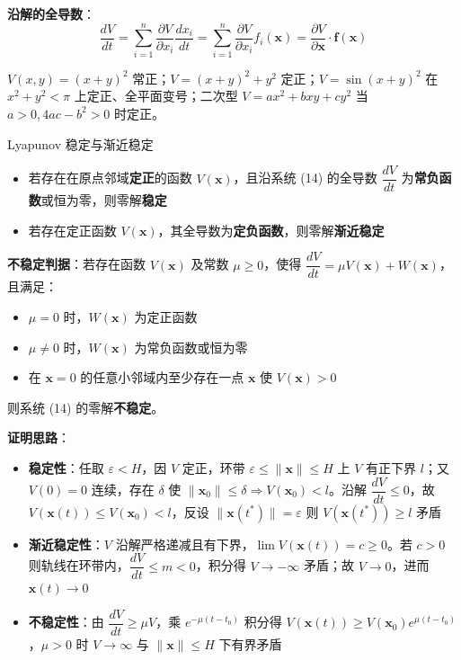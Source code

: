 \textbf{沿解的全导数}：
$$\frac{dV}{dt} = \sum_{i=1}^{n}\frac{\partial V}{\partial x_i}\frac{dx_i}{dt} = \sum_{i=1}^{n}\frac{\partial V}{\partial x_i}f_i(\mathbf{x}) = \frac{\partial V}{\partial \mathbf{x}}\cdot\mathbf{f}(\mathbf{x})$$

\begin{example}
$V(x,y) = (x+y)^2$ 常正；$V = (x+y)^2 + y^2$ 定正；$V = \sin(x+y)^2$ 在 $x^2+y^2 < \pi$ 上定正、全平面变号；二次型 $V = ax^2 + bxy + cy^2$ 当 $a > 0, 4ac - b^2 > 0$ 时定正。
\end{example}

\begin{myTheorem}{Lyapunov 稳定与渐近稳定}
\begin{itemize}
    \item 若存在在原点邻域\textbf{定正}的函数 $V(\mathbf{x})$，且沿系统 (14) 的全导数 $\dfrac{dV}{dt}$ 为\textbf{常负函数}或恒为零，则零解\textbf{稳定}
    \item 若存在定正函数 $V(\mathbf{x})$，其全导数为\textbf{定负函数}，则零解\textbf{渐近稳定}
\end{itemize}
\end{myTheorem}

\textbf{不稳定判据}：若存在函数 $V(\mathbf{x})$ 及常数 $\mu \ge 0$，使得 $\dfrac{dV}{dt} = \mu V(\mathbf{x}) + W(\mathbf{x})$，且满足：
\begin{itemize}
    \item $\mu = 0$ 时，$W(\mathbf{x})$ 为定正函数
    \item $\mu \neq 0$ 时，$W(\mathbf{x})$ 为常负函数或恒为零
    \item 在 $\mathbf{x} = 0$ 的任意小邻域内至少存在一点 $\mathbf{x}$ 使 $V(\mathbf{x}) > 0$
\end{itemize}
则系统 (14) 的零解\textbf{不稳定}。

\textbf{证明思路}：
\begin{itemize}
    \item \textbf{稳定性}：任取 $\varepsilon < H$，因 $V$ 定正，环带 $\varepsilon \le \|\mathbf{x}\| \le H$ 上 $V$ 有正下界 $l$；又 $V(0) = 0$ 连续，存在 $\delta$ 使 $\|\mathbf{x}_0\| \le \delta \Rightarrow V(\mathbf{x}_0) < l$。沿解 $\dfrac{dV}{dt} \le 0$，故 $V(\mathbf{x}(t)) \le V(\mathbf{x}_0) < l$，反设 $\|\mathbf{x}(t^*)\| = \varepsilon$ 则 $V(\mathbf{x}(t^*)) \ge l$ 矛盾
    \item \textbf{渐近稳定性}：$V$ 沿解严格递减且有下界，$\lim V(\mathbf{x}(t)) = c \ge 0$。若 $c > 0$ 则轨线在环带内，$\dfrac{dV}{dt} \le m < 0$，积分得 $V \to -\infty$ 矛盾；故 $V \to 0$，进而 $\mathbf{x}(t) \to 0$
    \item \textbf{不稳定性}：由 $\dfrac{dV}{dt} \ge \mu V$，乘 $e^{-\mu(t-t_0)}$ 积分得 $V(\mathbf{x}(t)) \ge V(\mathbf{x}_0)e^{\mu(t-t_0)}$，$\mu > 0$ 时 $V \to \infty$ 与 $\|\mathbf{x}\| \le H$ 下有界矛盾
\end{itemize}


